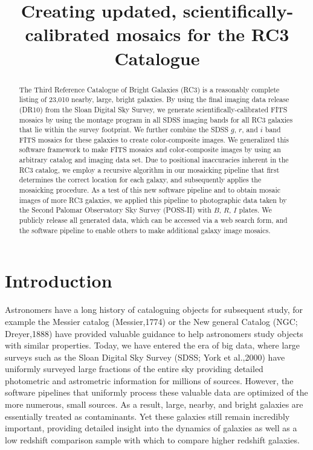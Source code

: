\documentclass[authoryear, 12pt,5p, times]{elsarticle}
\begin{document}
\begin{frontmatter}
\title{Creating updated, scientifically-calibrated mosaics for the RC3 Catalogue}
	\begin{abstract}

The Third Reference Catalogue of Bright Galaxies (RC3) is a reasonably complete listing of 23,010 nearby, large, bright galaxies. By using the final imaging data release (DR10) from the Sloan Digital Sky Survey, we generate scientifically-calibrated FITS mosaics by using the montage program in all SDSS imaging bands for all RC3 galaxies that lie within the survey footprint. We further combine the SDSS $g$, $r$, and $i$ band FITS mosaics for these galaxies to create color-composite images. We generalized this software framework to make FITS mosaics and color-composite images by using an arbitrary catalog and imaging data set. Due to positional inaccuracies inherent in the RC3 catalog, we employ a recursive algorithm in our mosaicking pipeline that first determines the correct location for each galaxy, and subsequently applies the mosaicking procedure. As a test of this new software pipeline and to obtain mosaic images of more RC3 galaxies, we applied this pipeline to  photographic data taken by the Second Palomar Observatory Sky Survey (POSS-II) with $B$, $R$, $I$ plates. We publicly release all generated data, which can be accessed via a web search form, and the software pipeline to enable others to make additional galaxy image mosaics.
	\end{abstract}
\end{frontmatter}
\section{Introduction}

Astronomers have a long history of cataloguing objects for subsequent study, for example the Messier catalog (Messier,1774) or the New general Catalog (NGC; Dreyer,1888) have provided valuable guidance to help astronomers study objects with similar properties. Today, we have entered the era of big data, where large surveys such as the Sloan Digital Sky Survey (SDSS; York et al.,2000) have uniformly surveyed large fractions of the entire sky providing detailed photometric and astrometric information for millions of sources. However, the software pipelines that uniformly process these valuable data are optimized of the more numerous, small sources. As a result, large, nearby, and bright galaxies are essentially treated as contaminants. Yet these galaxies still remain incredibly important, providing detailed insight into the dynamics of galaxies as well as a low redshift comparison sample with which to compare higher redshift galaxies. 
\end{document}
